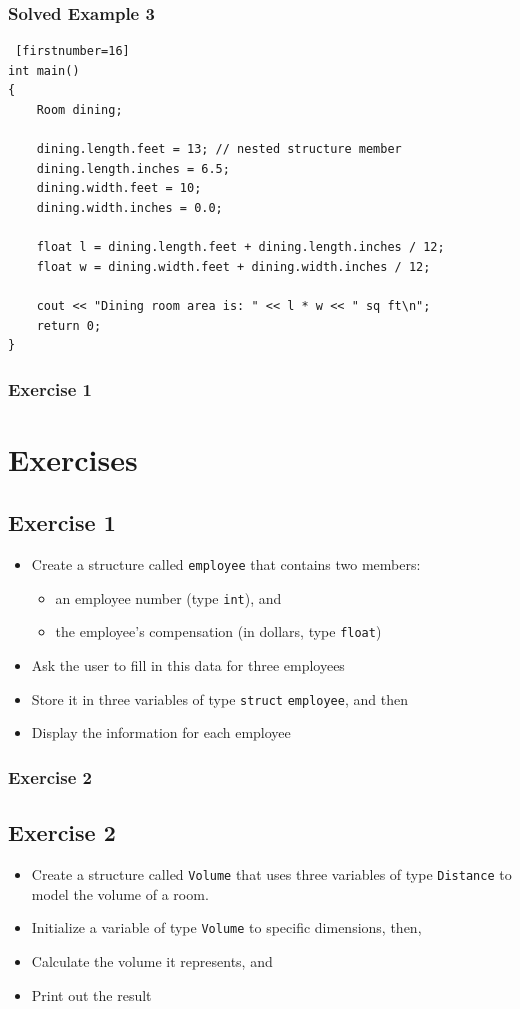 \documentclass{beamer}
\begin{document}
\begin{frame} [fragile]
    \frametitle{Solved Example 3}
    \lstset{style=mystyle}
\begin{lstlisting} [firstnumber=16]
int main()
{
    Room dining;

    dining.length.feet = 13; // nested structure member
    dining.length.inches = 6.5;
    dining.width.feet = 10;
    dining.width.inches = 0.0;

    float l = dining.length.feet + dining.length.inches / 12;
    float w = dining.width.feet + dining.width.inches / 12;

    cout << "Dining room area is: " << l * w << " sq ft\n";
    return 0;
}
\end{lstlisting}
\end{frame}

\begin{frame}
    \frametitle{Exercise 1}
    \section{Exercises} %
    \label{sec:exercises}
    \subsection{Exercise 1} %
    \label{sub:exercise_1}
    \begin{itemize}
        \item Create a structure called \texttt{employee} that contains two members:
        \begin{itemize}
            \item an employee number (type \texttt{int}), and
            \item the employee's compensation (in dollars, type \texttt{float})
        \end{itemize}
        \item Ask the user to fill in this data for three employees
        \item Store it in three variables of type \texttt{struct} \texttt{employee}, and then
        \item Display the information for each employee
    \end{itemize}
\end{frame}

\begin{frame}
    \frametitle{Exercise 2}
    \subsection{Exercise 2} %
    \label{sub:exercise_2}
    \begin{itemize}
        \item Create a structure called \texttt{Volume} that uses three variables of type \texttt{Distance} to model the volume of a room.
        \item Initialize a variable of type \texttt{Volume} to specific dimensions, then,
        \item Calculate the volume it represents, and
        \item Print out the result
    \end{itemize}
\end{frame}
\end{document}
